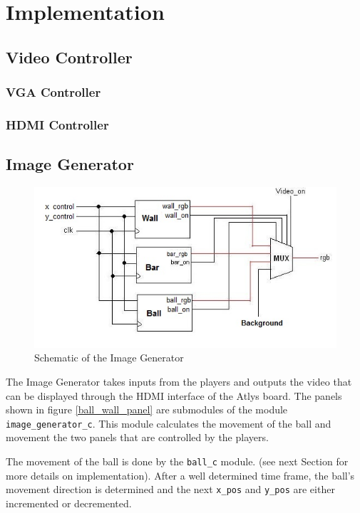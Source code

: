 \newpage
\section{Implementation}
	\subsection{Video Controller}
        \subsubsection{VGA Controller}
        \subsubsection{HDMI Controller}
    \subsection{Image Generator}
	\begin{figure}[here]
		\centering
		\includegraphics[scale=0.7]{images/img_gen.jpg}
		\caption{Schematic of the Image Generator}
		\label{img_gen}
	\end{figure}
        The Image Generator takes inputs from the players and outputs the video that can be displayed through the HDMI interface of the Atlys board. The panels shown in figure \ref{ball_wall_panel} are submodules of the module \texttt{image\_generator\_c}.
		This module calculates the movement of the ball and movement the two panels that are controlled by the players. 
		
		The movement of the ball is done by the \texttt{ball\_c} module. (see next Section for more details on implementation).
		After a well determined time frame, the ball's movement direction is determined and the next \texttt{x\_pos} and \texttt{y\_pos} are either incremented or decremented. 
		
